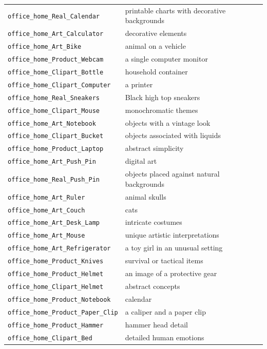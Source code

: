 \documentclass{article} %
\begin{document}
\begin{longtable}{p{} p{}}
\texttt{office\_home\_Real\_Calendar} & printable charts with decorative backgrounds \\
\texttt{office\_home\_Art\_Calculator} & decorative elements \\
\texttt{office\_home\_Art\_Bike} & animal on a vehicle \\
\texttt{office\_home\_Product\_Webcam} & a single computer monitor \\
\texttt{office\_home\_Clipart\_Bottle} & household container \\
\texttt{office\_home\_Clipart\_Computer} & a printer \\
\texttt{office\_home\_Real\_Sneakers} & Black high top sneakers \\
\texttt{office\_home\_Clipart\_Mouse} & monochromatic themes \\
\texttt{office\_home\_Art\_Notebook} & objects with a vintage look \\
\texttt{office\_home\_Clipart\_Bucket} & objects associated with liquids \\
\texttt{office\_home\_Product\_Laptop} & abstract simplicity \\
\texttt{office\_home\_Art\_Push\_Pin} & digital art \\
\texttt{office\_home\_Real\_Push\_Pin} & objects placed against natural backgrounds \\
\texttt{office\_home\_Art\_Ruler} & animal skulls \\
\texttt{office\_home\_Art\_Couch} & cats \\
\texttt{office\_home\_Art\_Desk\_Lamp} & intricate costumes \\
\texttt{office\_home\_Art\_Mouse} & unique artistic interpretations \\
\texttt{office\_home\_Art\_Refrigerator} & a toy girl in an unusual setting \\
\texttt{office\_home\_Product\_Knives} & survival or tactical items \\
\texttt{office\_home\_Product\_Helmet} & an image of a protective gear \\
\texttt{office\_home\_Clipart\_Helmet} & abstract concepts \\
\texttt{office\_home\_Product\_Notebook} & calendar \\
\texttt{office\_home\_Product\_Paper\_Clip} & a caliper and a paper clip \\
\texttt{office\_home\_Product\_Hammer} & hammer head detail \\
\texttt{office\_home\_Clipart\_Bed} & detailed human emotions \\

\end{longtable}
\end{document}
